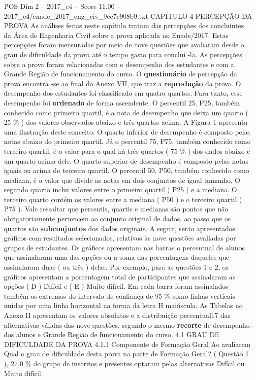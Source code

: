 \begin{textsample}{POS Dim 2 – 2017\_c4 – Score 11.00 – 2017\_c4/enade\_2017\_eng\_civ\_9cc7e908b9.txt}  \label{ex:f2_pos_095}
CAPÍTULO 4 PERCEPÇÃO DA PROVA As análises feitas neste capítulo tratam das percepções dos concluintes da Área de Engenharia Civil sobre a prova aplicada no Enade/2017.
Estas percepções foram mensuradas por meio de nove questões que avaliaram desde o grau de dificuldade da prova até o tempo gasto para concluí -la.
As percepções sobre a prova foram relacionadas com o desempenho dos estudantes e com a Grande Região de funcionamento do curso.
O \textbf{questionário} de percepção da prova encontra -se ao final do Anexo VII, que traz a \textbf{reprodução} da prova.
O desempenho dos estudantes foi classificado em quatro quartos.
Para tanto, esse desempenho foi \textbf{ordenado} de forma ascendente.
O percentil 25, P25, também conhecido como primeiro quartil, é a nota de desempenho que deixa um quarto ( 25 \% ) dos valores observados abaixo e três quartos acima.
A Figura 1 apresenta uma ilustração deste conceito.
O quarto inferior de desempenho é composto pelas notas abaixo do primeiro quartil.
Já o percentil 75, P75, também conhecido como terceiro quartil, é o valor para o qual há três quartos ( 75 \% ) dos dados abaixo e um quarto acima dele.
O quarto superior de desempenho é composto pelas notas iguais ou acima do terceiro quartil.
O percentil 50, P50, também conhecido como mediana, é o valor que divide as notas em dois conjuntos de igual tamanho.
O segundo quarto inclui valores entre o primeiro quartil ( P25 ) e a mediana.
O terceiro quarto contém os valores entre a mediana ( P50 ) e o terceiro quartil ( P75 ).
Vale ressaltar que percentis, quartis e medianas são pontos que não obrigatoriamente pertencem ao conjunto original de dados, ao passo que os quartos são \textbf{subconjuntos} dos dados originais.
A seguir, serão apresentados gráficos com resultados selecionados, relativos às nove questões avaliadas por grupos de estudantes.
Os gráficos apresentam nas barras o percentual de alunos que assinalaram uma das opções ou a soma das porcentagens daqueles que assinalaram duas ( ou três ) delas.
Por exemplo, para as questões 1 e 2, os gráficos apresentam a porcentagem total de participantes que assinalaram as opções ( D ) Difícil e ( E ) Muito difícil.
Em cada barra foram assinalados também os extremos do intervalo de confiança de 95 \% como linhas verticais unidas por uma linha horizontal na forma da letra H maiúscula.
As Tabelas no Anexo II apresentam os valores absolutos e a distribuição percentual17 das alternativas válidas das nove questões, segundo o mesmo \textbf{recorte} de desempenho dos alunos e Grande Região de funcionamento do curso. 4.1 GRAU DE DIFICULDADE DA PROVA 4.1.1 Componente de Formação Geral Ao avaliarem Qual o grau de dificuldade desta prova na parte de Formação Geral? ( Questão 1 ), 27,0 \% do grupo de inscritos e presentes optaram pelas alternativas Difícil ou Muito difícil.

\end{textsample}
